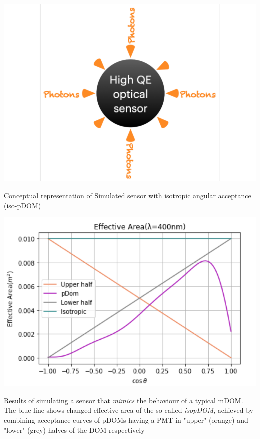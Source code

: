 \begin{marginfigure}
    \includegraphics{./figures/gen2/iso-pDOM.pdf}
    \caption{Conceptual representation of Simulated sensor with isotropic angular acceptance (iso-pDOM)}
\end{marginfigure}

\begin{marginfigure}
    \includegraphics{./figures/gen2/isopDOM_eff_area.png}
    \caption{Results of simulating a sensor that \emph{mimics} the behaviour of a typical mDOM. The blue line shows changed effective area of the so-called \emph{isopDOM}, achieved by combining acceptance curves of pDOMs having a PMT in "upper" (orange) and "lower" (grey) halves of the DOM respectively}
\end{marginfigure}


